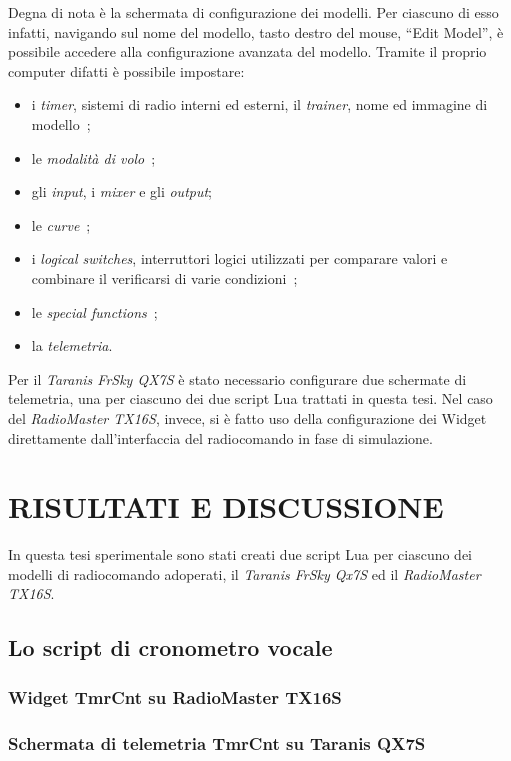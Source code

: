\documentclass[a4paper, 12pt]{report}
\begin{document}
Degna di nota è la schermata di configurazione dei modelli. Per ciascuno di esso infatti, navigando sul nome del modello, tasto destro del mouse, ``Edit Model'', è possibile accedere alla configurazione avanzata del modello. Tramite il proprio computer difatti è possibile impostare:
\begin{itemize}
        \item   i \emph{timer}, sistemi di radio interni ed esterni, il \emph{trainer}, nome ed immagine di modello~\cite{opentx-companion-model-setup};
        \item   le \emph{modalità di volo}~\cite{opentx-companion-flight-modes};
        \item   gli \emph{input}, i \emph{mixer} e gli \emph{output};
        \item   le \emph{curve}~\cite{opentx-companion-curves};
        \item   i \emph{logical switches}, interruttori logici utilizzati per comparare valori e combinare il verificarsi di varie condizioni~\cite{opentx-companion-logical-switches};
        \item   le \emph{special functions}~\cite{opentx-companion-special-functions};
        \item   la \emph{telemetria}.
\end{itemize}

Per il \emph{Taranis FrSky QX7S} è stato necessario configurare due schermate di telemetria, una per ciascuno dei due script Lua trattati in questa tesi. Nel caso del \emph{RadioMaster TX16S}, invece, si è fatto uso della configurazione dei Widget direttamente dall'interfaccia del radiocomando in fase di simulazione.

\chapter{RISULTATI E DISCUSSIONE}
In questa tesi sperimentale sono stati creati due script Lua per ciascuno dei modelli di radiocomando adoperati, il \emph{Taranis FrSky Qx7S} ed il \emph{RadioMaster TX16S}.
\section{Lo script di cronometro vocale}


\subsection{Widget TmrCnt su RadioMaster TX16S}
\subsection{Schermata di telemetria TmrCnt su Taranis QX7S}
\end{document}
